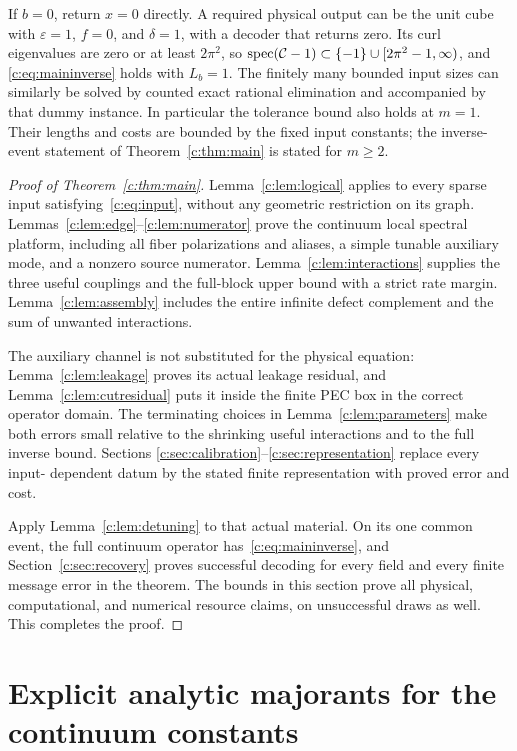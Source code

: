 If $b=0$, return $x=0$ directly. A required physical output can be
the unit cube with $\varepsilon=1$, $f=0$, and $\delta=1$, with a
decoder that returns zero. Its curl eigenvalues are zero or at least
$2\pi^2$, so $\operatorname{spec}(\mathcal C-1)\subset\{-1\}\cup[2\pi^2-1,\infty)$, and
\eqref{c:eq:maininverse} holds with $L_b=1$. The finitely many bounded input sizes
can similarly be solved by counted exact rational elimination and
accompanied by that dummy instance. In particular the tolerance bound
also holds at $m=1$. Their lengths and costs are bounded by the
fixed input constants; the inverse-event statement of Theorem~\ref{c:thm:main}
is stated for $m\ge2$.

\begin{proof}[Proof of Theorem~\ref{c:thm:main}]
Lemma~\ref{c:lem:logical} applies to every sparse input
satisfying~\eqref{c:eq:input}, without
any geometric restriction on its graph. Lemmas~\ref{c:lem:edge}--\ref{c:lem:numerator}
prove the continuum local spectral platform, including all fiber
polarizations and aliases, a simple tunable auxiliary mode, and a
nonzero source numerator. Lemma~\ref{c:lem:interactions} supplies the
three useful couplings and the full-block upper bound with a strict
rate margin. Lemma~\ref{c:lem:assembly} includes the entire infinite
defect complement and the sum of unwanted interactions.

The auxiliary channel is not substituted for the physical equation:
Lemma~\ref{c:lem:leakage} proves its actual leakage residual, and
Lemma~\ref{c:lem:cutresidual} puts it inside the finite PEC box in the
correct operator domain. The terminating choices in
Lemma~\ref{c:lem:parameters} make both errors small relative to the
shrinking useful interactions and to the full inverse bound. Sections
\ref{c:sec:calibration}--\ref{c:sec:representation} replace every input-
dependent datum by the stated finite representation with proved
error and cost.

Apply Lemma~\ref{c:lem:detuning} to that actual material. On its one
common event, the full continuum operator has~\eqref{c:eq:maininverse},
and Section~\ref{c:sec:recovery} proves successful decoding for every
field and every finite message error in the theorem. The bounds in
this section prove all physical, computational, and numerical resource
claims, on unsuccessful draws as well. This completes the proof.
\end{proof}

\section{Explicit analytic majorants for the continuum constants}
\label{c:app:ledger}

